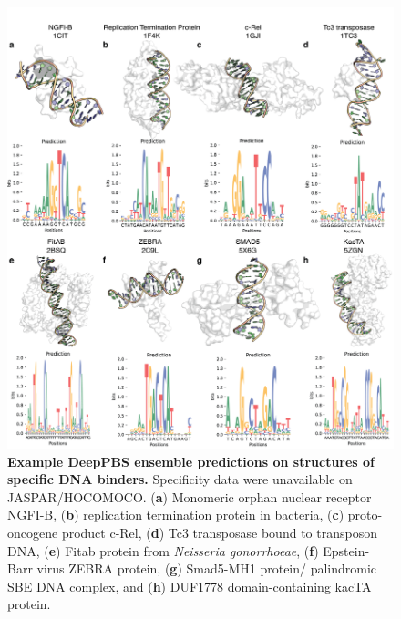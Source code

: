 \begin{center}
\begin{figure}[H]
  \includegraphics[width=\linewidth]{./pdnafigs/figS7.png}
    \caption[Example DeepPBS ensemble predictions on structures of specific DNA binders.]{\textbf{Example DeepPBS ensemble predictions on structures of specific DNA binders.} Specificity data were
unavailable on JASPAR/HOCOMOCO.  ({\bf a}) Monomeric orphan nuclear receptor NGFI-B, ({\bf b}) replication termination protein in bacteria, ({\bf c}) proto-oncogene product c-Rel, ({\bf d}) Tc3 transposase bound to transposon DNA, ({\bf e}) Fitab protein from \textit{Neisseria gonorrhoeae}, ({\bf f}) Epstein-Barr virus ZEBRA protein, ({\bf g}) Smad5-MH1 protein/ palindromic SBE DNA complex, and ({\bf h}) DUF1778 domain-containing kacTA protein.}
  \label{fig:pdnaS7}
\end{figure}
\end{center}

